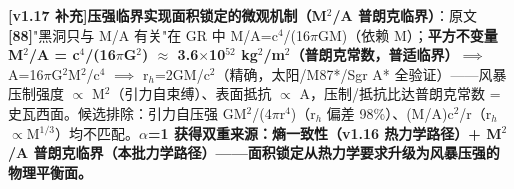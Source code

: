 \documentclass[UTF8,fontset=windows]{csoarticle}
\newcommand{\mtag}[1]{\textbf{[#1]}}
\newcommand{\up}[1]{\ensuremath{^{#1}}}
\newcommand{\down}[1]{\ensuremath{_{#1}}}
\begin{document}
\textbf{\mtag{v1.17 补充}压强临界实现面积锁定的微观机制（M\up{2}/A 普朗克临界）}：原文\mtag{88}"黑洞只与 M/A 有关"在 GR 中 M/A=c\up{4}/(16\ensuremath{\pi}GM)（依赖 M）；\textbf{平方不变量 M\up{2}/A = c\up{4}/(16\ensuremath{\pi}G\up{2}) \ensuremath{\approx} 3.6\ensuremath{\times}10\up{52} kg\up{2}/m\up{2}（普朗克常数，普适临界）}\ensuremath{\implies} A=16\ensuremath{\pi}G\up{2}M\up{2}/c\up{4} \ensuremath{\implies} r\down{h}=2GM/c\up{2}（精确，太阳/M87*/Sgr A* 全验证）------风暴压制强度 \ensuremath{\propto} M\up{2}（引力自束缚）、表面抵抗 \ensuremath{\propto} A，压制/抵抗比达普朗克常数 = 史瓦西面。候选排除：引力自压强 GM\up{2}/(4\ensuremath{\pi}r\up{4})（r\down{h} 偏差 98\%）、(M/A)c\up{2}/r（r\down{h}\ensuremath{\propto}M\up{1/3}）均不匹配。\textbf{\ensuremath{\alpha}=1 获得双重来源：熵一致性（v1.16 热力学路径）+ M\up{2}/A 普朗克临界（本批力学路径）------面积锁定从热力学要求升级为风暴压强的物理平衡面。}
\end{document}

